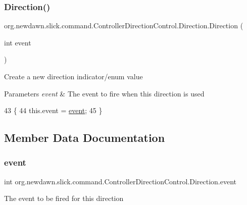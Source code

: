 \subsubsection{\texorpdfstring{Direction()}{Direction()}}
{\footnotesize\ttfamily org.\+newdawn.\+slick.\+command.\+Controller\+Direction\+Control.\+Direction.\+Direction (\begin{DoxyParamCaption}\item[{int}]{event }\end{DoxyParamCaption})\hspace{0.3cm}{\ttfamily [inline]}}

Create a new direction indicator/enum value


\begin{DoxyParams}{Parameters}
{\em event} & The event to fire when this direction is used \\
\hline
\end{DoxyParams}

\begin{DoxyCode}
43                                     \{
44             this.\textcolor{keyword}{event} = \mbox{\hyperlink{classorg_1_1newdawn_1_1slick_1_1command_1_1_controller_direction_control_1_1_direction_aaa18d419563e506bd39f1d6d48d5b3f8}{event}};
45         \}
\end{DoxyCode}


\subsection{Member Data Documentation}
\mbox{\label{classorg_1_1newdawn_1_1slick_1_1command_1_1_controller_direction_control_1_1_direction_aaa18d419563e506bd39f1d6d48d5b3f8}} 
\subsubsection{\texorpdfstring{event}{event}}
{\footnotesize\ttfamily int org.\+newdawn.\+slick.\+command.\+Controller\+Direction\+Control.\+Direction.\+event\hspace{0.3cm}{\ttfamily [private]}}

The event to be fired for this direction 